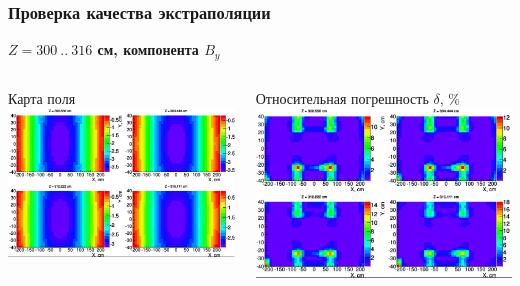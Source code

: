 \documentclass[svgnames] {beamer}
\begin{document}
\begin{frame}
  \frametitle{Проверка качества экстраполяции}
  \begin{block}{\centering \bf $Z = 300 ~..~ 316$ см, компонента $B_{y}$}
    \begin{columns}[c]
      \begin{block}{\centering Карта поля}
        \centering \includegraphics[width=1.0\linewidth]{By_fieldMap_new.png}
      \end{block}
      \begin{block}{\footnotesize Относительная погрешность \centering $\delta$, \%}
        \centering \includegraphics[width=1.0\linewidth]{By_diff_overlap_reg_new.png}
      \end{block}
    \end{columns}
   \end{block}  
\end{frame}
\end{document}
